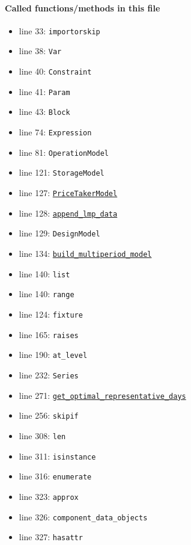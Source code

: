 \documentclass[11pt]{report}
\begin{document}
\paragraph{Called functions/methods in this file}
\begin{itemize}[leftmargin=*]
  \item line 33: \texttt{importorskip}
  \item line 38: \texttt{Var}
  \item line 40: \texttt{Constraint}
  \item line 41: \texttt{Param}
  \item line 43: \texttt{Block}
  \item line 74: \texttt{Expression}
  \item line 81: \texttt{OperationModel}
  \item line 121: \texttt{StorageModel}
  \item line 127: \hyperref[def:pricetaker-price_taker_model.py:PriceTakerModel:L161]{\texttt{PriceTakerModel}}
  \item line 128: \hyperref[def:pricetaker-price_taker_model.py:PriceTakerModel.append_lmp_data:L221]{\texttt{append\_lmp\_data}}
  \item line 129: \texttt{DesignModel}
  \item line 134: \hyperref[def:pricetaker-price_taker_model.py:PriceTakerModel.build_multiperiod_model:L291]{\texttt{build\_multiperiod\_model}}
  \item line 140: \texttt{list}
  \item line 140: \texttt{range}
  \item line 124: \texttt{fixture}
  \item line 165: \texttt{raises}
  \item line 190: \texttt{at\_level}
  \item line 232: \texttt{Series}
  \item line 271: \hyperref[def:pricetaker-price_taker_model.py:PriceTakerModel.get_optimal_representative_days:L262]{\texttt{get\_optimal\_representative\_days}}
  \item line 256: \texttt{skipif}
  \item line 308: \texttt{len}
  \item line 311: \texttt{isinstance}
  \item line 316: \texttt{enumerate}
  \item line 323: \texttt{approx}
  \item line 326: \texttt{component\_data\_objects}
  \item line 327: \texttt{hasattr}

\end{itemize}
\end{document}
